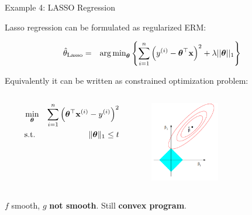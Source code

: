 \begin{vbframe}{Example 4: LASSO Regression}
	
Lasso regression can be formulated as regularized ERM: 

\begin{eqnarray*}  
		\hat{\theta}_{\text{Lasso}} &=&  \operatorname{arg\,min}_{\bm{\theta}} \left\{ \sum\limits_{i=1}^n \left(y^{(i)} - \bm{\theta}^\top\mathbf{x}\right)^2 + \lambda ||\bm{\theta}||_1 \right\} 
\end{eqnarray*}

Equivalently it can be written as constrained optimization problem: 

	\vspace*{-0.2cm}
	\begin{columns}[T] %
		\begin{column}{.48\textwidth}
			\begin{eqnarray*}
				\min_{\bm{\theta}} && \sum_{i = 1}^n \left(\bm{\theta}^\top \mathbf{x}^{(i)} - y^{(i)}\right)^2 \\
				\text{s.t. } && \|\bm{\theta}\|_1 \le t
			\end{eqnarray*}
		\end{column}

		\begin{column}{.48\textwidth}
			\begin{center}
				\includegraphics[width=0.45\textwidth, keepaspectratio]{figure_man/lasso.png} 
			\end{center}
		\end{column}
	\end{columns}	

\vspace*{0.2cm}

$f$ smooth, $g$ \textbf{not smooth}. Still \textbf{convex program}. 

\end{vbframe}


